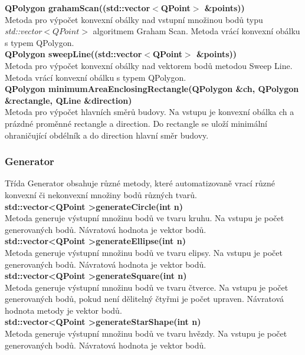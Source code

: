 \documentclass[a4paper,11pt,twoside]{article}
\begin{document}
\noindent\textbf{QPolygon grahamScan((std::vector$<$QPoint$>$ \&points))}\\
Metoda pro výpočet konvexní obálky nad vstupní množinou bodů typu \textit{std::vector$<QPoint>$} algoritmem Graham Scan. Metoda vrácí konvexní obálku s typem QPolygon.
\\

\noindent\textbf{QPolygon sweepLine((std::vector$<$QPoint$>$ \&points))}\\
Metoda pro výpočet konvexní obálky nad vektorem bodů metodou Sweep Line. Metoda vrácí konvexní obálku s typem QPolygon.
\\

\noindent\textbf{QPolygon minimumAreaEnclosingRectangle(QPolygon \&ch, QPolygon \&rectangle, QLine \&direction)}\\
Metoda pro výpočet hlavních směrů budovy. Na vstupu je konvexní obálka ch a prázdné proměnné rectangle a direction. Do rectangle se uloží minimální ohraničující obdélník a do direction hlavní směr budovy.

\subsubsection{Generator}
Třída Generator obsahuje různé metody, které automatizovaně vrací různé konvexní či nekonvexní množiny bodů různých tvarů. \\

\noindent\textbf{std::vector\textless QPoint \textgreater generateCircle(int n)}\\
Metoda generuje výstupní množinu bodů ve tvaru kruhu. Na vstupu je počet generovaných bodů. Návratová hodnota je vektor bodů.\\

\noindent\textbf{std::vector\textless QPoint \textgreater generateEllipse(int n)}\\
Metoda generuje výstupní množinu bodů ve tvaru elipsy. Na vstupu je počet generovaných bodů. Návratová hodnota je vektor bodů.\\

\noindent\textbf{std::vector\textless QPoint \textgreater generateSquare(int n)}\\
Metoda generuje výstupní množinu bodů ve tvaru čtverce. Na vstupu je počet generovaných bodů, pokud není dělitelný čtyřmi je počet upraven. Návratová hodnota metody je vektor bodů.\\

\noindent\textbf{std::vector\textless QPoint \textgreater generateStarShape(int n)}\\
Metoda generuje výstupní množinu bodů ve tvaru hvězdy. Na vstupu je počet generovaných bodů. Návratová hodnota je vektor bodů.\\
\end{document}
